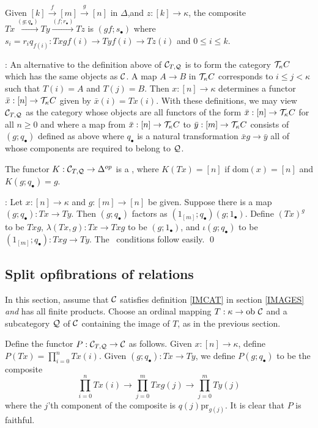 Given $[k] \stackrel{f}{\to} [m] \stackrel{g}{\to} [n]$ in 
$\Delta$,and $z : [k] \to \kappa$, the composite $Tx 
\stackrel{(g;q_\bullet)}{\longrightarrow} Ty 
\stackrel{(f;r_\bullet)}{\longrightarrow} Tz$ is $(gf;s_\bullet)$ 
where $s_i = r_i q_{f(i)} : Txgf(i) \to Tyf(i) \to Tz(i)$ and $0 \le 
i \le k$.
\bigskip

: An alternative to the definition above of ${{\bf \cal C}}_{T,{\bf \cal Q}}$ is to form the category ${\bf \cal T}_\kappa C$ which has the 
same objects as ${\bf \cal C}$. A map $A \to B$ in ${\bf \cal T}_\kappa C$ 
corresponds to $i \le j < \kappa$ such that $T(i)=A$ and $T(j)=B$. 
Then $x : [n] \to \kappa$ determines a functor $\bar x : [n] \to {\bf \cal T}_\kappa C$ given by $\bar x (i) =Tx(i)$. With these definitions, we 
may view ${{\bf \cal C}}_{T,{\bf \cal Q}}$ as the category whose objects are all 
functors of the form $\bar x : [n] \to {\bf \cal T}_\kappa C$ for all $n \ge 
0$ and where a map from $\bar x : [n]\to {\bf \cal T}_\kappa C$ to $\bar y : 
[m] \to {\bf \cal T}_\kappa C$ consists of $(g;q_\bullet)$ defined as above 
where $q_\bullet$ is a natural transformation $\bar x g \to \bar y$ 
all of whose components are required to belong to ${\bf \cal Q}$. 

\begin{thm} \label{CTQ_SOF}
The functor $K : {{\bf \cal C}}_{T,{\bf \cal Q}} \to \Delta^{op}$ is a \SOF, where 
$K(Tx)=[n]$ if dom$(x)=[n]$ and $K(g;q_\bullet)=g$. \end{thm}

: Let $x : [n] \to \kappa$ and $g : [m] \to [n]$ be 
given. Suppose there is a map $(g;q_\bullet) : Tx \to Ty$. Then 
$(g;q_\bullet)$ factors as $(1_{[m]};q_\bullet) (g;1_\bullet)$. 
Define $(Tx)^g$ to be $Txg$, $\lambda(Tx,g) : Tx \to Txg$ to be 
$(g;1_\bullet)$, and $\iota(g;q_\bullet)$ to be $(1_{[m]};q_\bullet) 
: Txg \to Ty$. The \SOF\ conditions follow easily. \qed 

\subsection{Split opfibrations of relations} \label{REL_SOF}

In this section, assume that ${\bf \cal C}$ satisfies definition \ref{IMCAT} 
in section \ref{IMAGES} {\em and} has all finite products. Choose an 
ordinal mapping $T : \kappa \to \mbox{ob } {\bf \cal C}$ and a subcategory 
${\bf \cal Q}$ of ${\bf \cal C}$ containing the image of $T$, as in the previous 
section.

Define the functor $P : {{\bf \cal C}}_{T,{\bf \cal Q}} \to {\bf \cal C}$ as follows. 
Given $x : [n] \to \kappa$, define $P(Tx) = \prod_{i=0}^n Tx(i)$. 
Given $(g;q_\bullet) : Tx \to Ty$, we define $P(g;q_\bullet)$ to be 
the composite $$\prod_{i=0}^n Tx(i) \to \prod_{j=0}^m Txg(j) \to 
\prod_{j=0}^m Ty(j)$$ where the $j$'th component of the composite is 
$q(j) \mbox{pr}_{g(j)}$. It is clear that $P$ is faithful. 

